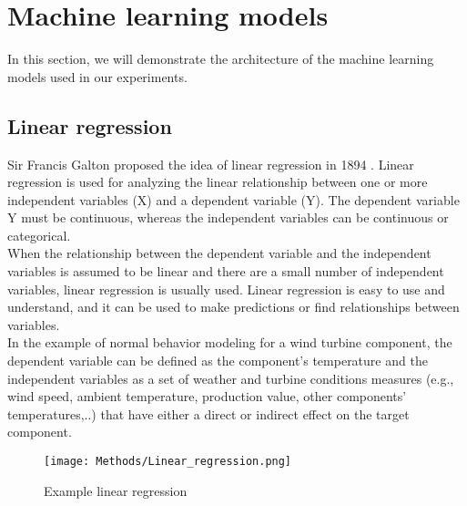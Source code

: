 \section{Machine learning models}
In this section, we will demonstrate the architecture of the machine learning models used in our experiments.

\subsection{Linear regression}
  Sir Francis Galton proposed the idea of linear regression in 1894 \cite{Natural_Inheritance}.
  Linear regression is used for analyzing the linear relationship between one or more independent variables (X) and a dependent variable (Y).
  The dependent variable Y must be continuous, whereas the independent variables can be continuous or categorical. \\
  When the relationship between the dependent variable and the independent variables is assumed to be linear and there are a small number of independent variables, 
  linear regression is usually used. Linear regression is easy to use and understand, and it can be used to make predictions or find relationships between variables.\\
  In the example of normal behavior modeling for a wind turbine component, the dependent variable can be defined as the component's temperature 
  and the independent variables as a set of weather and turbine conditions measures (e.g., wind speed, ambient temperature, production value, other components' temperatures,..) 
  that have either a direct or indirect effect on the target component.

  \begin{figure}[!htbp]
      \begin{center}
        \texttt{[image: Methods/Linear\_regression.png]}
      \end{center}
      \caption{Example linear regression}
      \label{fig:linear_regression}
  \end{figure}

